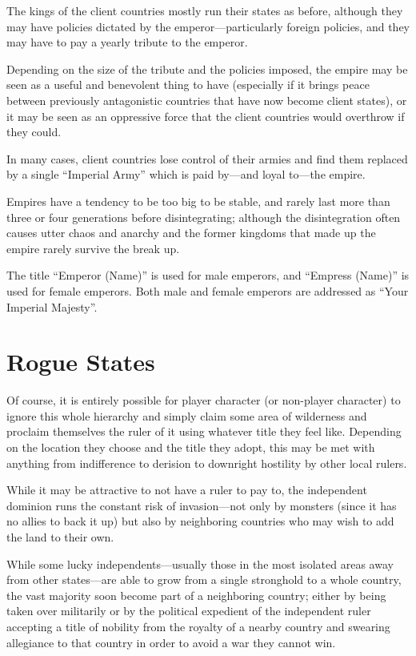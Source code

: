 \begin{multicols*}{2}
The kings of the client countries mostly run their states as before, although they may have policies dictated by the emperor—particularly foreign policies, and they may have to pay a yearly tribute to the emperor.

Depending on the size of the tribute and the policies imposed, the empire may be seen as a useful and benevolent thing to have (especially if it brings peace between previously antagonistic countries that have now become client states), or it may be seen as an oppressive force that the client countries would overthrow if they could.

In many cases, client countries lose control of their armies and find them replaced by a single “Imperial Army” which is paid by—and loyal to—the empire.

Empires have a tendency to be too big to be stable, and rarely last more than three or four generations before disintegrating; although the disintegration often causes utter chaos and anarchy and the former kingdoms that made up the empire rarely survive the break up.

The title “Emperor (Name)” is used for male emperors, and “Empress (Name)” is used for female emperors. Both male and female emperors are addressed as “Your Imperial Majesty”.

\section{Rogue States}
Of course, it is entirely possible for player character (or non-player character) to ignore this whole hierarchy and simply claim some area of wilderness and proclaim themselves the ruler of it using whatever title they feel like. Depending on the location they choose and the title they adopt, this may be met with anything from indifference to derision to downright hostility by other local rulers.

While it may be attractive to not have a ruler to pay  to, the independent dominion runs the constant risk of invasion—not only by monsters (since it has no allies to back it up) but also by neighboring countries who may wish to add the land to their own.

While some lucky independents—usually those in the most isolated areas away from other states—are able to grow from a single stronghold to a whole country, the vast majority soon become part of a neighboring country; either by being taken over militarily or by the political expedient of the independent ruler accepting a title of nobility from the royalty of a nearby country and swearing allegiance to that country in order to avoid a war they cannot win.


\end{multicols*}
